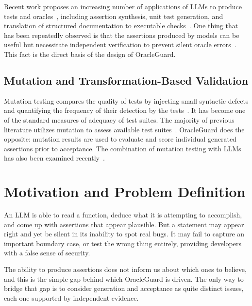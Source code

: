 \documentclass[conference]{IEEEtran}
\begin{document}
Recent work proposes an increasing number of applications of LLMs to produce tests and oracles~\cite{hayet2024chatassert,bodicoat2025understanding,hossain2024togll}, including assertion synthesis, unit test generation, and translation of structured documentation to executable checks~\cite{hossain2024togll,hossain2025doc2oracll}. One thing that has been repeatedly observed is that the assertions produced by models can be useful but necessitate independent verification to prevent silent oracle errors~\cite{bodicoat2025understanding}. This fact is the direct basis of the design of OracleGuard.

\subsection{Mutation and Transformation-Based Validation}

Mutation testing compares the quality of tests by injecting small syntactic defects and quantifying the frequency of their detection by the tests~\cite{jia2011mutation,papadakis2019mutation}. It has become one of the standard measures of adequacy of test suites. The majority of previous literature utilizes mutation to assess available test suites~\cite{jia2011mutation,papadakis2019mutation}. OracleGuard does the opposite: mutation results are used to evaluate and score individual generated assertions prior to acceptance. The combination of mutation testing with LLMs has also been examined recently~\cite{straubinger2025mutation,zhang2025simulink,alimadadi2026hybrid}.

\section{Motivation and Problem Definition}

An LLM is able to read a function, deduce what it is attempting to accomplish, and come up with assertions that appear plausible. But a statement may appear right and yet be silent in its inability to spot real bugs. It may fail to capture an important boundary case, or test the wrong thing entirely, providing developers with a false sense of security.

The ability to produce assertions does not inform us about which ones to believe, and this is the simple gap behind which OracleGuard is driven. The only way to bridge that gap is to consider generation and acceptance as quite distinct issues, each one supported by independent evidence.
\end{document}
